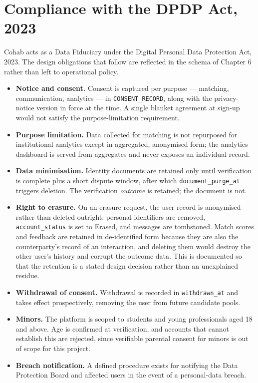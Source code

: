 \documentclass[12pt,a4paper]{report}
\begin{document}
\section{Compliance with the DPDP Act, 2023}

Cohab acts as a Data Fiduciary under the Digital Personal Data Protection Act, 2023. The design obligations that follow are reflected in the schema of Chapter 6 rather than left to operational policy.

\begin{itemize}[noitemsep]
    \item \textbf{Notice and consent.} Consent is captured per purpose --- matching, communication, analytics --- in \texttt{CONSENT\_RECORD}, along with the privacy-notice version in force at the time. A single blanket agreement at sign-up would not satisfy the purpose-limitation requirement.
    \item \textbf{Purpose limitation.} Data collected for matching is not repurposed for institutional analytics except in aggregated, anonymised form; the analytics dashboard is served from aggregates and never exposes an individual record.
    \item \textbf{Data minimisation.} Identity documents are retained only until verification is complete plus a short dispute window, after which \texttt{document\_purge\_at} triggers deletion. The verification \emph{outcome} is retained; the document is not.
    \item \textbf{Right to erasure.} On an erasure request, the user record is anonymised rather than deleted outright: personal identifiers are removed, \texttt{account\_status} is set to Erased, and messages are tombstoned. Match scores and feedback are retained in de-identified form because they are also the counterparty's record of an interaction, and deleting them would destroy the other user's history and corrupt the outcome data. This is documented so that the retention is a stated design decision rather than an unexplained residue.
    \item \textbf{Withdrawal of consent.} Withdrawal is recorded in \texttt{withdrawn\_at} and takes effect prospectively, removing the user from future candidate pools.
    \item \textbf{Minors.} The platform is scoped to students and young professionals aged 18 and above. Age is confirmed at verification, and accounts that cannot establish this are rejected, since verifiable parental consent for minors is out of scope for this project.
    \item \textbf{Breach notification.} A defined procedure exists for notifying the Data Protection Board and affected users in the event of a personal-data breach.
\end{itemize}
\end{document}
